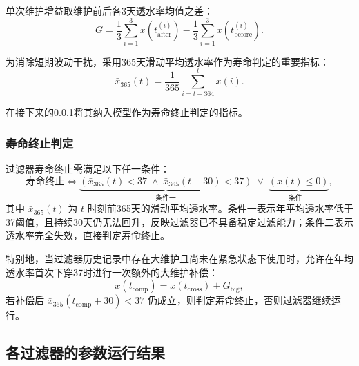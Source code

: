 \documentclass[withoutpreface,bwprint]{cumcmthesis}
\begin{document}
单次维护增益取维护前后各3天透水率均值之差：
\begin{equation}
	G = \frac{1}{3}\sum_{i=1}^{3} x(t_{\text{after}}^{(i)}) - \frac{1}{3}\sum_{i=1}^{3} x(t_{\text{before}}^{(i)}).
\end{equation}

为消除短期波动干扰，采用365天滑动平均透水率作为寿命判定的重要指标：
\begin{equation}
	\bar{x}_{365}(t) = \frac{1}{365}\sum_{i=t-364}^{t} x(i).
\end{equation}

在接下来的\ref{sec:寿命判定}将其纳入模型作为寿命终止判定的指标。

\subsubsection{寿命终止判定}\label{sec:寿命判定}
过滤器寿命终止需满足以下任一条件：
\[
	\text{寿命终止} \iff 
	\underbrace{\left( \bar{x}_{365}(t) < 37 \; \land \; \bar{x}_{365}(t+30) < 37 \right)}_{\text{条件一}}
	\; \lor \;
	\underbrace{\left( x(t) \leq 0 \right)}_{\text{条件二}},
\]
其中 $\bar{x}_{365}(t)$ 为 $t$ 时刻前365天的滑动平均透水率。条件一表示年平均透水率低于37阈值，且持续30天仍无法回升，反映过滤器已不具备稳定过滤能力；条件二表示透水率完全失效，直接判定寿命终止。

特别地，当过滤器历史记录中存在大维护且尚未在紧急状态下使用时，允许在年均透水率首次下穿37时进行一次额外的大维护补偿：
\begin{equation}
	x(t_{\text{comp}}) = x(t_{\text{cross}}) + G_{\text{big}},
\end{equation}
若补偿后 $\bar{x}_{365}(t_{\text{comp}}+30) < 37$ 仍成立，则判定寿命终止，否则过滤器继续运行。

\subsection{各过滤器的参数运行结果}
\end{document}
